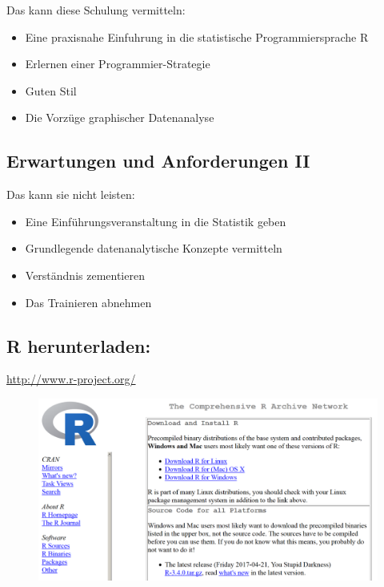 \documentclass[]{article}
\providecommand{\tightlist}{%
  \setlength{\itemsep}{0pt}\setlength{\parskip}{0pt}}
\begin{document}
Das kann diese Schulung vermitteln:

\begin{itemize}
\tightlist
\item
  Eine praxisnahe Einfuhrung in die statistische Programmiersprache R
\item
  Erlernen einer Programmier-Strategie
\item
  Guten Stil
\item
  Die Vorzüge graphischer Datenanalyse
\end{itemize}

\subsection{Erwartungen und Anforderungen
II}\label{erwartungen-und-anforderungen-ii}

Das kann sie nicht leisten:

\begin{itemize}
\tightlist
\item
  Eine Einführungsveranstaltung in die Statistik geben
\item
  Grundlegende datenanalytische Konzepte vermitteln
\item
  Verständnis zementieren
\item
  Das Trainieren abnehmen
\end{itemize}

\subsection{R herunterladen:}\label{r-herunterladen}

\url{http://www.r-project.org/}

\begin{figure}[htbp]
\centering
\includegraphics{figure/CRAN1picture.PNG}
\caption{}
\end{figure}
\end{document}
